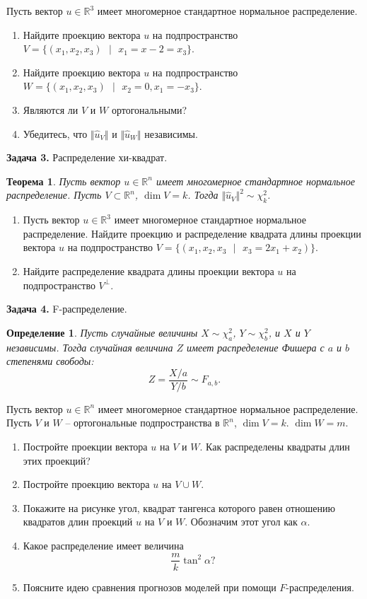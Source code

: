 \documentclass[10pt, a4paper]{extarticle}
\newtheorem{theor}{Теорема}
\newtheorem{defn}{Определение}
\def \R{\mathbb{R}}
\begin{document}
	Пусть вектор $u \in \R^3$ имеет многомерное стандартное нормальное распределение.
	\begin{enumerate}[label=\textbf{\alph*)}]
		\item Найдите проекцию вектора $u$ на подпространство $V = \{(x_1, x_2, x_3) \text{ }| \text{ } x_1 = x-2 = x_3\}$.
		\item Найдите проекцию вектора $u$ на подпространство
		$W = \{(x_1, x_2, x_3) \text{ }| \text{ } x_2 = 0, x_1 = -x_3\}$.
		\item Являются ли $V$ и $W$ ортогональными?
		\item Убедитесь, что $\Vert\hat{u}_V\Vert$ и $\Vert\hat{u}_W\Vert$ независимы.
	\end{enumerate} 
	\vspace{1em}
	
	{\Large \textbf{Задача 3.} Распределение хи-квадрат.}
	\begin{theor}
		Пусть вектор $u \in \R^n$ имеет многомерное стандартное нормальное распределение. Пусть $V \subset \R^n$, $\dim V = k$. Тогда $\Vert\hat{u}_V\Vert^2 \sim \chi^2_k$.
	\end{theor}

	\begin{enumerate}[label=\textbf{\alph*)}]
		\item Пусть вектор $u \in \R^3$ имеет многомерное стандартное нормальное распределение. Найдите проекцию и распределение квадрата длины проекции вектора $u$ на подпространство $V = \{(x_1, x_2, x_3 \text{ } | \text{ } x_3 = 2x_1 + x_2)\}$.
		\item Найдите распределение квадрата длины проекции вектора $u$ на подпространство $V^{\perp}$.
	\end{enumerate}
	\vspace{1em}

	{\Large \textbf{Задача 4.} F-распределение.}
	\begin{defn}
		Пусть случайные величины $X \sim \chi^2_{a}$, $Y \sim \chi^2_{b}$, и $X$ и $Y$ независимы. Тогда случайная величина $Z$ имеет распределение Фишера с $a$ и $b$ степенями свободы:
		\[
		Z = \dfrac{X/a}{Y/b} \sim F_{a, b}.
		\]
	\end{defn}
	
	Пусть вектор $u \in \R^n$ имеет многомерное стандартное нормальное распределение. Пусть $V$ и $W$ -- ортогональные подпространства в $\R^n$, $\dim V = k$. $\dim W = m$.
	\begin{enumerate}[label=\textbf{\alph*)}]
		\item Постройте проекции вектора $u$ на $V$ и $W$. Как распределены квадраты длин этих проекций?
		\item Постройте проекцию вектора $u$ на $V \cup W$.
		\item Покажите на рисунке угол, квадрат тангенса которого равен отношению квадратов длин проекций $u$ на $V$ и $W$. Обозначим этот угол как $\alpha$.
		\item Какое распределение имеет величина
		\[
		\dfrac{m}{k}\tan^2 \alpha ?
		\]
		\item Поясните идею сравнения прогнозов моделей при помощи $F$-распределения.
	\end{enumerate}
	\vspace{1em}
\end{document}
